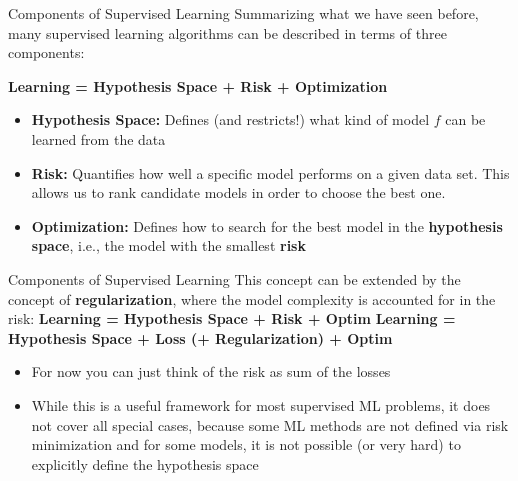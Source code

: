 \documentclass[11pt,compress,t,notes=noshow, xcolor=table]{beamer}
\begin{document}


\begin{framev}{Components of Supervised Learning}
Summarizing what we have seen before, many supervised learning algorithms can be described in terms of three components:
\vfill
\begin{center}
\textbf{Learning = Hypothesis Space + Risk + Optimization}
\end{center}
\vfill
\begin{itemize}
\item \textbf{Hypothesis Space:} Defines (and restricts!) what kind of model $f$ can be learned from the data
\item \textbf{Risk:} Quantifies how well a specific model performs on a given data set. This allows us to rank candidate models in order to choose the best one.
\item \textbf{Optimization:} Defines how to search for the best model in the \textbf{hypothesis space}, i.e., the model with the smallest \textbf{risk}
\end{itemize}
\end{framev}


\begin{framev}{Components of Supervised Learning}
This concept can be extended by the concept of \textbf{regularization}, where the model complexity is accounted for in the risk:
\vfill
\textbf{Learning = Hypothesis Space +  Risk + Optim }
\textbf{Learning = Hypothesis Space + Loss (+ Regularization) + Optim}
\vfill
\begin{itemize}
\item For now you can just think of the risk as sum of the losses
\item While this is a useful framework for most supervised ML problems, it does not cover all special cases, because some ML methods are not defined via risk minimization and for some models, it is not possible (or very hard) to explicitly define the hypothesis space
\end{itemize}
\end{framev}
\end{document}
